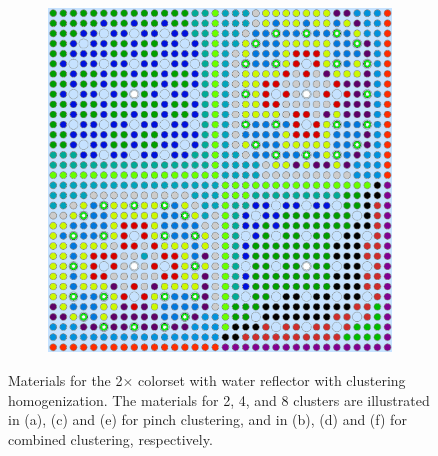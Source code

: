 \begin{figure}[h!]
\begin{subfigure}{0.48\textwidth}
  \caption{}
  \label{fig:chap10-reflector-pinch-8}
\end{subfigure}%
\begin{subfigure}{0.48\textwidth}
  \centering
  \includegraphics[width=0.9\linewidth]{figures/unsupervised/geometries/with-features/8-clusters/combined/reflector}
  \caption{}
  \label{fig:chap10-reflector-combined-8}
\end{subfigure}
\caption[Materials for the 2$\times$2 colorset with reflector with clustering homogenization]{Materials for the 2$\times$ colorset with water reflector with clustering homogenization. The materials for 2, 4, and 8 clusters are illustrated in (a), (c) and (e) for pinch clustering, and in (b), (d) and (f) for combined clustering, respectively.}
\label{fig:chap10-reflector-geometries}
\end{figure}

\clearpage

